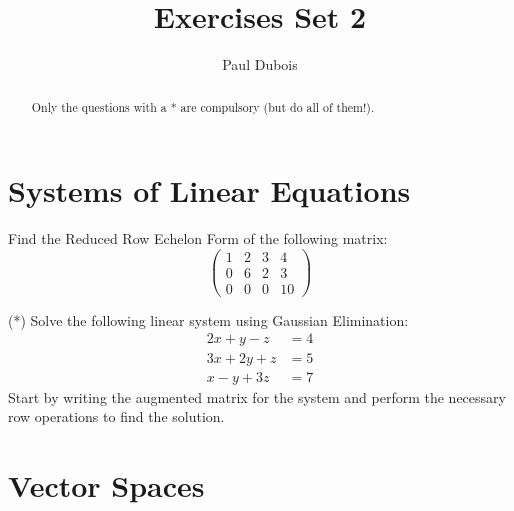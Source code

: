 \documentclass[]{article}
\title{Exercises Set 2}
\author{Paul Dubois}
\begin{document}
	
	\maketitle
	
	\begin{abstract}
		Only the questions with a * are compulsory (but do all of them!).
	\end{abstract}
	
	\section{Systems of Linear Equations}
	Find the Reduced Row Echelon Form of the following matrix:
	$$\begin{pmatrix}
		1 & 2 & 3 & 4\\
		0 & 6 & 2 & 3\\
		0 & 0 & 0 & 10
	\end{pmatrix}$$
	
	(*) Solve the following linear system using Gaussian Elimination:
	\begin{align*}
		2x + y - z &= 4 \\
		3x + 2y + z &= 5 \\
		x - y + 3z &= 7
	\end{align*}
	Start by writing the augmented matrix for the system and perform the necessary row operations to find the solution.
	
	
	\section{Vector Spaces}
	
		

	
\end{document}
